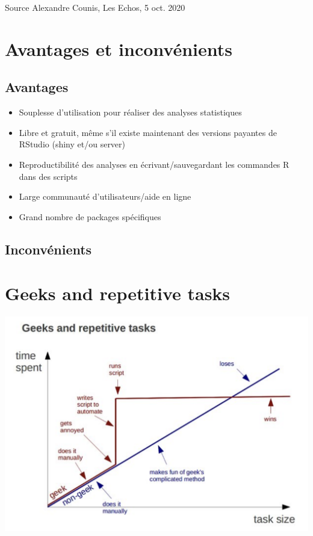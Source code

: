 \documentclass[
]{book}
\providecommand{\tightlist}{%
  \setlength{\itemsep}{0pt}\setlength{\parskip}{0pt}}
\begin{document}
Source Alexandre Counis, Les Echos, 5 oct. 2020

\hypertarget{avantages-et-inconvuxe9nients}{%
\section{Avantages et inconvénients}\label{avantages-et-inconvuxe9nients}}

\hypertarget{avantages}{%
\subsection{Avantages}\label{avantages}}

\begin{itemize}
\tightlist
\item
  Souplesse d'utilisation pour réaliser des analyses statistiques
\item
  Libre et gratuit, même s'il existe maintenant des versions payantes de RStudio (shiny et/ou server)
\item
  Reproductibilité des analyses en écrivant/sauvegardant les commandes R dans des scripts
\item
  Large communauté d'utilisateurs/aide en ligne
\item
  Grand nombre de packages spécifiques
\end{itemize}

\hypertarget{inconvuxe9nients}{%
\subsection{Inconvénients}\label{inconvuxe9nients}}

\hypertarget{geeks-and-repetitive-tasks}{%
\section{Geeks and repetitive tasks}\label{geeks-and-repetitive-tasks}}

\includegraphics{images/geeks.png}
\end{document}
